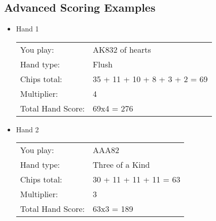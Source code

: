 \documentclass[11pt]{article}
\begin{document}
\subsection{Advanced Scoring Examples}
\label{sec:org04a70a0}
\begin{itemize}
\item Hand 1
\begin{center}
\begin{tabular}{ll}
You play: & AK832 of hearts\\[0pt]
Hand type: & Flush\\[0pt]
Chips total: & 35 + 11 + 10 + 8 + 3 + 2 = 69\\[0pt]
Multiplier: & 4\\[0pt]
Total Hand Score: & 69x4 = 276\\[0pt]
\end{tabular}
\end{center}
\item Hand 2
\begin{center}
\begin{tabular}{ll}
You play: & AAA82\\[0pt]
Hand type: & Three of a Kind\\[0pt]
Chips total: & 30 + 11 + 11 + 11 = 63\\[0pt]
Multiplier: & 3\\[0pt]
Total Hand Score: & 63x3 = 189\\[0pt]
\end{tabular}
\end{center}
\end{itemize}
\end{document}
